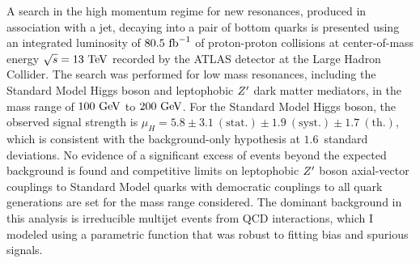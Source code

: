 A search in the high momentum regime for new resonances, produced in association with a jet, decaying into a pair of bottom quarks is presented using an integrated luminosity of $80.5~\mathrm{fb}^{-1}$ of proton-proton collisions at center-of-mass energy $\sqrt{s}=13~\mathrm{TeV}$ recorded by the ATLAS detector at the Large Hadron Collider.
The search was performed for low mass resonances, including the Standard Model Higgs boson and leptophobic $Z^{\prime}$ dark matter mediators, in the mass range of $100~\mathrm{GeV}$ to $200~\mathrm{GeV}$.
For the Standard Model Higgs boson, the observed signal strength is $\mu_{H} = 5.8 \pm 3.1~\mathrm{(stat.)} \pm 1.9~\mathrm{(syst.)} \pm 1.7~\mathrm{(th.)}$, which is consistent with the background-only hypothesis at $1.6$~standard deviations.
No evidence of a significant excess of events beyond the expected background is found and competitive limits on leptophobic $Z^{\prime}$ boson axial-vector couplings to Standard Model quarks with democratic couplings to all quark generations are set for the mass range considered.
The dominant background in this analysis is irreducible multijet events from QCD interactions, which I modeled using a parametric function that was robust to fitting bias and spurious signals.

